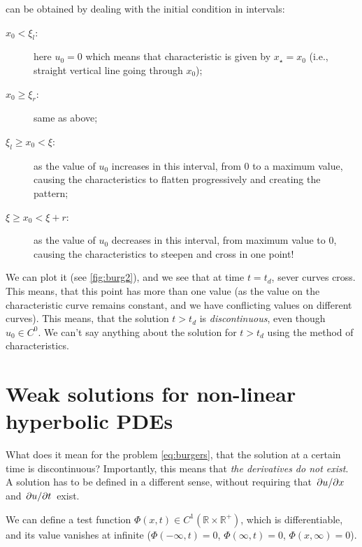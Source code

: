 \documentclass[justified, nobib, a4page]{tufte-handout}
\begin{document}
 can be obtained by dealing with the 
initial condition in intervals:
\begin{description}
  \item[\(x_0 < \xi_l\):] here \(u_0 = 0\) which means that characteristic is 
    given by \(x_\star = x_0\) (i.e., straight vertical line going through \(x_0\));
  \item[\(x_0 \geq \xi_r\):] same as above;
  \item[\(\xi_l \geq x_0 < \xi\):] as the value of \(u_0\) increases in this interval, from
    0 to a maximum value, causing the characteristics to flatten progressively and creating the 
     pattern;
  \item[\(\xi \geq x_0 < \xi+r\):] as the value of \(u_0\) decreases in this interval, from
    maximum value to 0, causing the characteristics to steepen and cross in one point!
\end{description}
We can plot it (see \cref{fig:burg2}), and we see that at time \(t=t_d\), sever
curves cross. This means, that this point has more than one value (as the value
on the characteristic curve remains constant, and we have conflicting values on
different curves). This means, that the solution \(t>t_d\) is \emph{discontinuous},
even though \(u_0 \in C^0\). We can't say anything about the solution for \(t>t_d\)
using the method of characteristics.

\section{Weak solutions for non-linear hyperbolic PDEs}
What does it mean for the problem \cref{eq:burgers}, that the solution at a
certain time is discontinuous? Importantly, this means that \emph{the
derivatives do not exist}. A solution has to be defined in a different 
sense, without requiring that \(\pdv{u}/{x}\) and \(\pdv{u}/{t}\) exist.

We can define a test function \(\Phi(x,t)\in
C^1(\mathbb{R}\times\mathbb{R}^+)\), which is differentiable, and its value
vanishes at infinite (\(\Phi(-\infty, t) = 0\), \(\Phi(\infty, t) = 0\),
\(\Phi(x, \infty) = 0\)). 
\end{document}
